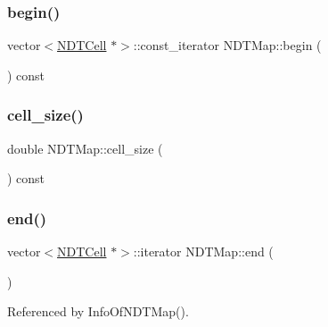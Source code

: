 \subsubsection{\texorpdfstring{begin()}{begin()}\hspace{0.1cm}{\footnotesize\ttfamily [2/2]}}
{\footnotesize\ttfamily vector$<$\hyperlink{classNDTCell}{N\+D\+T\+Cell} $\ast$$>$\+::const\+\_\+iterator N\+D\+T\+Map\+::begin (\begin{DoxyParamCaption}{ }\end{DoxyParamCaption}) const\hspace{0.3cm}{\ttfamily [inline]}}

\mbox{\label{classNDTMap_a3395ccebb28846b416550ba71b5da174}} 
\subsubsection{\texorpdfstring{cell\+\_\+size()}{cell\_size()}}
{\footnotesize\ttfamily double N\+D\+T\+Map\+::cell\+\_\+size (\begin{DoxyParamCaption}{ }\end{DoxyParamCaption}) const\hspace{0.3cm}{\ttfamily [inline]}}

\mbox{\label{classNDTMap_a001f919cb4e5b0a784b9b69ba95cb035}} 
\subsubsection{\texorpdfstring{end()}{end()}\hspace{0.1cm}{\footnotesize\ttfamily [1/2]}}
{\footnotesize\ttfamily vector$<$\hyperlink{classNDTCell}{N\+D\+T\+Cell} $\ast$$>$\+::iterator N\+D\+T\+Map\+::end (\begin{DoxyParamCaption}{ }\end{DoxyParamCaption})\hspace{0.3cm}{\ttfamily [inline]}}



Referenced by Info\+Of\+N\+D\+T\+Map().

\mbox{\label{classNDTMap_a96f1e8b110d1a542f06792945e240cb3}} 
